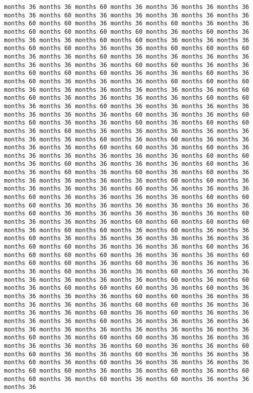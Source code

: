 \documentclass[11pt]{article}
\begin{document}
\begin{Verbatim}[commandchars=\\\{\}, frame=single, framerule=2mm, rulecolor=\color{outerrorbackground}]
months 36 months 36 months 60 months 36 months 36 months 36 months 36 months 36 months 60 months 36 months 36 months 36 months 36 months 36 months 60 months 60 months 36 months 36 months 60 months 36 months 36 months 60 months 60 months 60 months 60 months 36 months 60 months 36 months 36 months 36 months 60 months 60 months 36 months 36 months 36 months 60 months 60 months 36 months 36 months 60 months 60 months 60 months 36 months 36 months 60 months 36 months 36 months 36 months 36 months 36 months 36 months 36 months 60 months 60 months 36 months 36 months 60 months 60 months 60 months 36 months 36 months 60 months 36 months 60 months 36 months 36 months 36 months 60 months 60 months 60 months 36 months 36 months 36 months 36 months 36 months 36 months 60 months 60 months 36 months 36 months 36 months 36 months 60 months 60 months 36 months 36 months 60 months 36 months 36 months 36 months 36 months 36 months 36 months 36 months 60 months 36 months 36 months 60 months 60 months 36 months 36 months 60 months 36 months 60 months 60 months 36 months 60 months 36 months 36 months 36 months 36 months 36 months 36 months 36 months 60 months 36 months 60 months 36 months 36 months 36 months 36 months 60 months 60 months 36 months 60 months 36 months 36 months 36 months 36 months 36 months 36 months 60 months 60 months 36 months 60 months 36 months 36 months 36 months 60 months 36 months 36 months 60 months 36 months 60 months 36 months 60 months 36 months 36 months 36 months 36 months 36 months 60 months 60 months 36 months 36 months 36 months 36 months 60 months 36 months 36 months 36 months 60 months 36 months 36 months 36 months 36 months 60 months 60 months 60 months 36 months 36 months 36 months 36 months 36 months 36 months 60 months 36 months 36 months 36 months 36 months 36 months 60 months 36 months 36 months 36 months 60 months 60 months 60 months 60 months 36 months 60 months 60 months 36 months 60 months 36 months 36 months 60 months 36 months 36 months 36 months 36 months 36 months 36 months 60 months 60 months 36 months 36 months 36 months 60 months 36 months 60 months 60 months 60 months 36 months 36 months 36 months 60 months 60 months 60 months 36 months 60 months 36 months 36 months 36 months 36 months 60 months 36 months 36 months 60 months 36 months 36 months 36 months 36 months 36 months 36 months 60 months 36 months 60 months 36 months 60 months 60 months 60 months 36 months 60 months 36 months 36 months 36 months 36 months 60 months 60 months 36 months 36 months 36 months 36 months 36 months 60 months 60 months 36 months 36 months 36 months 36 months 60 months 36 months 60 months 36 months 36 months 36 months 36 months 60 months 36 months 36 months 36 months 36 months 36 months 36 months 36 months 36 months 36 months 36 months 36 months 60 months 36 months 60 months 60 months 36 months 36 months 36 months 36 months 36 months 36 months 60 months 36 months 36 months 60 months 60 months 36 months 36 months 60 months 36 months 36 months 36 months 60 months 36 months 60 months 36 months 36 months 36 months 36 months 60 months 60 months 36 months 36 months 60 months 36 months 60 months 60 months 36 months 60 months 36 months 60 months 36 months 36 months 36 
\end{Verbatim}
\end{document}
